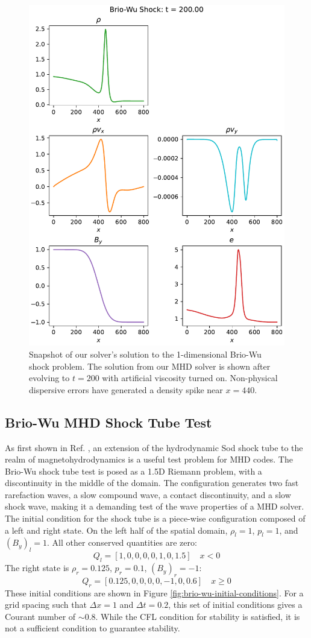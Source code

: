 \documentclass[%
 reprint,
 amsmath,amssymb,
 aps,
]{revtex4-2}
\begin{document}
\begin{figure}
\includegraphics[width=0.7\linewidth]{proj2-2/shock_snapshots_n_20.pdf}
\caption{\label{fig:brio-wu-snapshot}Snapshot of our solver's solution to the 1-dimensional Brio-Wu shock problem. The solution from our MHD solver is shown after evolving to $t=200$ with artificial viscosity turned on. Non-physical dispersive errors have generated a density spike near $x=440$.}
\end{figure}


\subsection{Brio-Wu MHD Shock Tube Test}

As first shown in Ref. \cite{BRIO1988400}, an extension of the hydrodynamic Sod shock tube to the realm of magnetohydrodynamics is a useful test problem for MHD codes. The Brio-Wu shock tube test is posed as a 1.5D Riemann problem, with a discontinuity in the middle of the domain. The configuration generates two fast rarefaction waves, a slow compound wave, a contact discontinuity, and a slow shock wave, making it a demanding test of the wave properties of a MHD solver.
The initial condition for the shock tube is a piece-wise configuration composed of a left and right state. On the left half of the spatial domain, $\rho_l = 1$, $p_l = 1$, and $(B_y)_l = 1$. All other conserved quantities are zero:
\begin{equation}
Q_l = [1, 0, 0, 0, 0, 1, 0, 1.5] \quad x < 0
\end{equation}
The right state is $\rho_r = 0.125$, $p_r = 0.1$, $(B_y)_r = -1$:
\begin{equation}
Q_r = [0.125, 0, 0, 0, 0, -1, 0, 0.6] \quad x \geq 0
\end{equation}
These initial conditions are shown in Figure \ref{fig:brio-wu-initial-conditions}. For a grid spacing such that $\Delta x = 1$ and $\Delta t = 0.2$, this set of initial conditions gives a Courant number of $\sim 0.8$. While the CFL condition for stability is satisfied, it is not a sufficient condition to guarantee stability.
\end{document}
